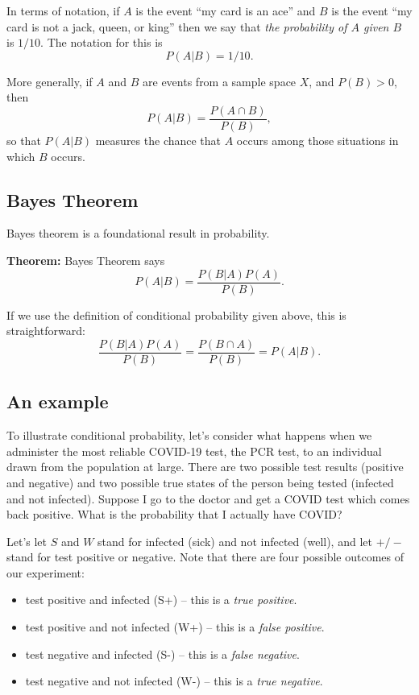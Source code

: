 \documentclass[
  oneside]{scrbook}
\providecommand{\tightlist}{%
  \setlength{\itemsep}{0pt}\setlength{\parskip}{0pt}}
\begin{document}
In terms of notation, if \(A\) is the event ``my card is an ace'' and
\(B\) is the event ``my card is not a jack, queen, or king'' then we say
that \emph{the probability of \(A\) given \(B\)} is \(1/10\). The
notation for this is \[
P(A|B) = 1/10.
\]

More generally, if \(A\) and \(B\) are events from a sample space \(X\),
and \(P(B)>0\), then \[
P(A|B) = \frac{P(A\cap B)}{P(B)},
\] so that \(P(A|B)\) measures the chance that \(A\) occurs among those
situations in which \(B\) occurs.

\hypertarget{bayes-theorem}{%
\subsection{Bayes Theorem}\label{bayes-theorem}}

Bayes theorem is a foundational result in probability.

\textbf{Theorem:} Bayes Theorem says \[
P(A|B) = \frac{P(B|A)P(A)}{P(B)}.
\]

If we use the definition of conditional probability given above, this is
straightforward: \[
\frac{P(B|A)P(A)}{P(B)} = \frac{P(B\cap A)}{P(B)} = P(A|B).
\]

\hypertarget{an-example}{%
\subsection{An example}\label{an-example}}

To illustrate conditional probability, let's consider what happens when
we administer the most reliable COVID-19 test, the PCR test, to an
individual drawn from the population at large. There are two possible
test results (positive and negative) and two possible true states of the
person being tested (infected and not infected). Suppose I go to the
doctor and get a COVID test which comes back positive. What is the
probability that I actually have COVID?

Let's let \(S\) and \(W\) stand for infected (sick) and not infected
(well), and let \(+/-\) stand for test positive or negative. Note that
there are four possible outcomes of our experiment:

\begin{itemize}
\tightlist
\item
  test positive and infected (S+) -- this is a \emph{true positive}.
\item
  test positive and not infected (W+) -- this is a \emph{false
  positive}.
\item
  test negative and infected (S-) -- this is a \emph{false negative}.
\item
  test negative and not infected (W-) -- this is a \emph{true negative}.
\end{itemize}
\end{document}
